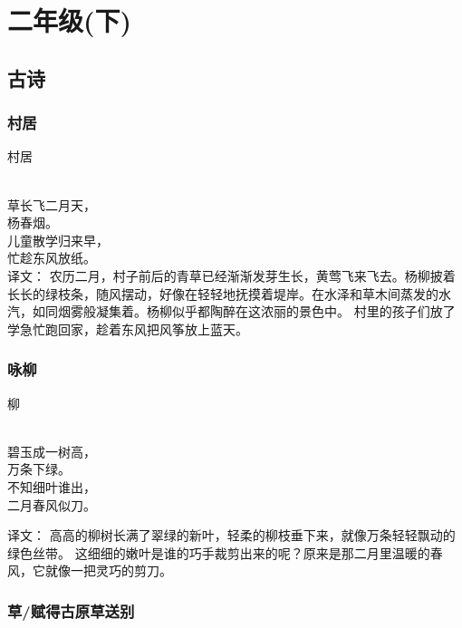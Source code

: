 \chapter{二年级(下)}
\section{古诗}

\subsection{村居}

\noindent 村居

  \\

\noindent 草长飞二月天，\\ 杨春烟。\\
儿童散学归来早，\\忙趁东风放纸。\\


译文：
农历二月，村子前后的青草已经渐渐发芽生长，黄莺飞来飞去。杨柳披着长长的绿枝条，随风摆动，好像在轻轻地抚摸着堤岸。在水泽和草木间蒸发的水汽，如同烟雾般凝集着。杨柳似乎都陶醉在这浓丽的景色中。
村里的孩子们放了学急忙跑回家，趁着东风把风筝放上蓝天。

\subsection{咏柳}

\noindent {}柳

  \\

\noindent 碧玉成一树高，\\万条下绿。\\
不知细叶谁出，\\二月春风似刀。

译文：
高高的柳树长满了翠绿的新叶，轻柔的柳枝垂下来，就像万条轻轻飘动的绿色丝带。
这细细的嫩叶是谁的巧手裁剪出来的呢？原来是那二月里温暖的春风，它就像一把灵巧的剪刀。

\subsection{草/赋得古原草送别}

